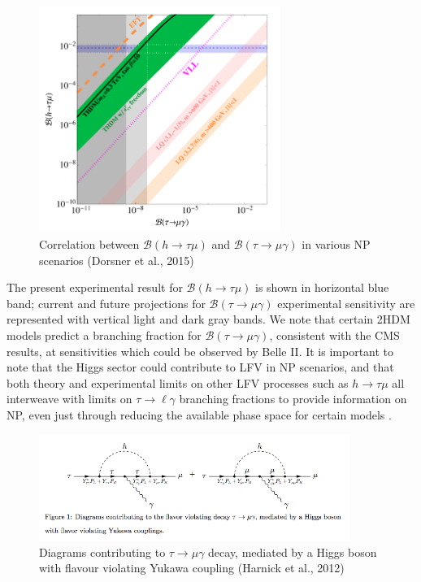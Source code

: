 \documentclass[12pt]{thesis}  %
\newcommand{\br}{\mathcal{B}}
\newcommand{\tmg}{\tau\to\mu\gamma}
\newcommand{\tlg}{\tau\to\ell\gamma}
\newcommand{\htm}{h\to \tau \mu}
\begin{document}
\begin{figure}[h]
\centering
\includegraphics[width=0.7\textwidth]{images/h-vs-tau.png}
\caption{Correlation between $\br(\htm)$ and $\br(\tmg)$ in various NP scenarios (Dorsner et al., 2015)}
\label{}
\end{figure}


The present experimental result for $\br(\htm)$ is shown in horizontal blue band; current and future projections for $\br(\tmg)$ experimental sensitivity are represented with vertical light and dark gray bands. We note that certain 2HDM models predict a branching fraction for $\br(\tmg)$, consistent with the CMS results, at sensitivities which could be observed by Belle II. It is important to note that the Higgs sector could contribute to LFV in NP scenarios, and that both theory and experimental limits on other LFV processes such as $\htm$ all interweave with limits on $\tlg$ branching fractions to provide information on NP, even just through reducing the available phase space for certain models \cite{Dorsner:2015}.

\begin{figure}[h]
\centering
\includegraphics[width=0.9\textwidth]{images/higgs-lfv-modes.png}
\caption{Diagrams contributing to $\tmg$ decay, mediated by a Higgs boson with flavour violating Yukawa coupling (Harnick et al., 2012)}
\label{}
\end{figure}
\end{document}
